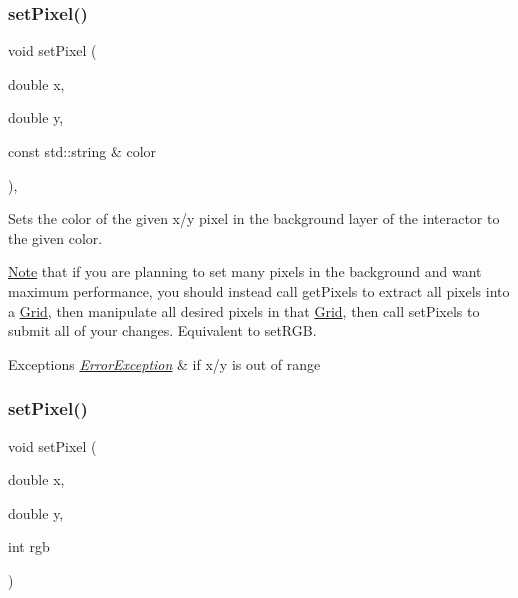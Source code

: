 \subsubsection{\texorpdfstring{set\+Pixel()}{setPixel()}\hspace{0.1cm}{\footnotesize\ttfamily [1/3]}}
{\footnotesize\ttfamily void set\+Pixel (\begin{DoxyParamCaption}\item[{double}]{x,  }\item[{double}]{y,  }\item[{const std\+::string \&}]{color }\end{DoxyParamCaption})\hspace{0.3cm}{\ttfamily [virtual]}, {\ttfamily [inherited]}}



Sets the color of the given x/y pixel in the background layer of the interactor to the given color. 

\mbox{\hyperlink{classNote}{Note}} that if you are planning to set many pixels in the background and want maximum performance, you should instead call get\+Pixels to extract all pixels into a \mbox{\hyperlink{classGrid}{Grid}}, then manipulate all desired pixels in that \mbox{\hyperlink{classGrid}{Grid}}, then call set\+Pixels to submit all of your changes. Equivalent to set\+R\+GB.


\begin{DoxyExceptions}{Exceptions}
{\em \mbox{\hyperlink{classErrorException}{Error\+Exception}}} & if x/y is out of range \\
\hline
\end{DoxyExceptions}
\mbox{\label{classGCanvas_a1fd61df1d79ebf3db7935d5c38c222e5}} 
\subsubsection{\texorpdfstring{set\+Pixel()}{setPixel()}\hspace{0.1cm}{\footnotesize\ttfamily [2/3]}}
{\footnotesize\ttfamily void set\+Pixel (\begin{DoxyParamCaption}\item[{double}]{x,  }\item[{double}]{y,  }\item[{int}]{rgb }\end{DoxyParamCaption})\hspace{0.3cm}{\ttfamily [virtual]}}



